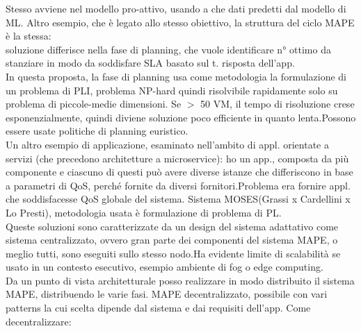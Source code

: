 \documentclass[16px]{article}
\begin{document}
Stesso avviene nel modello pro-attivo, usando a che dati predetti dal modello di ML.
Altro esempio, che è legato allo stesso obiettivo, la struttura del ciclo MAPE è la stessa:\\soluzione differisce nella fase di planning, che vuole identificare n° ottimo da stanziare in modo da soddisfare SLA basato sul t. risposta dell'app.\\In questa proposta, la fase di planning usa come metodologia la formulazione di un problema di PLI, problema NP-hard quindi risolvibile rapidamente solo su problema di piccole-medie dimensioni. Se $>$ 50 VM, il tempo di risoluzione crese esponenzialmente, quindi diviene soluzione poco efficiente in quanto lenta.Possono essere usate politiche di planning euristico.\\
Un altro esempio di applicazione, esaminato nell'ambito di appl. orientate a servizi (che precedono architetture a microservice): ho un app., composta da più componente e ciascuno di questi può avere diverse istanze che differiscono in base a parametri di QoS, perché fornite da diversi fornitori.Problema era fornire appl. che soddisfacesse QoS globale del sistema. Sistema MOSES(Grassi x Cardellini x Lo Presti), metodologia usata è formulazione di problema di PL.\\
Queste soluzioni sono caratterizzate da un design del sistema adattativo come sistema centralizzato, ovvero gran parte dei componenti del sistema MAPE, o meglio tutti, sono eseguiti sullo stesso nodo.Ha evidente limite di scalabilità se usato in un contesto esecutivo, esempio ambiente di fog o edge computing.\\
Da un punto di vista architetturale posso realizzare in modo distribuito il sistema MAPE, distribuendo le varie fasi. MAPE decentralizzato, possibile con vari patterns la cui scelta dipende dal sistema e dai requisiti dell'app.
Come decentralizzare:\\
\end{document}
